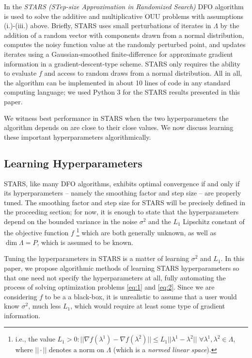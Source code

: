 \documentclass{amsart}
\begin{document}
In \cite{CW} the \textit{STARS (STep-size Approximation in Randomized Search)} DFO algorithm is used to solve the additive and multiplicative OUU problems with assumptions (i.)-(iii.) above. Briefly, STARS uses small perturbations of iterates in $\Lambda$ by the addition of a random vector with components drawn from a normal distribution, computes the noisy function value at the randomly perturbed point, and updates iterates using a Gaussian-smoothed finite-difference for approximate gradient information in a gradient-descent-type scheme. STARS only  requires the ability to evaluate $f$ and access to random draws from a normal distribution. All in all, the algorithm can be implemented in about 10 lines of code in any standard computing language; we used Python 3 for the STARS results presented in this paper. 

We witness best performance in STARS when the two hyperparameters the algorithm depends on are close to their close values. We now discuss learning these important hyperparameters algorithmically.


\subsection{Learning Hyperparameters} 
STARS, like many DFO algorithms, exhibits optimal convergence if and only if its hyperparameters -- namely the smoothing factor and step size -- are properly tuned. The smoothing factor and step size for STARS will be precisely defined in the proceeding section; for now, it is enough to state that the hyperparameters depend on the bounded variance in the noise $\sigma^2$ and the $L_1$ Lipschitz constant of the objective function $f$ 
\footnote{i.e., the value $L_1> 0: ||\nabla f(\lambda^1)-\nabla f(\lambda^2)|| \leq L_1 ||\lambda^1 -\lambda^2||$ $\forall \lambda^1, \lambda^2 \in \Lambda$, where $||\cdot||$ denotes a norm on $\Lambda$ (which is a \textit{normed linear space}).}
which are both generally unknown, as well as $\dim \Lambda=P$, which is assumed to be known. 

Tuning the hyperparameters in STARS is a matter of learning $\sigma^2$ and $L_1$. In this paper, we propose algorithmic methods of learning STARS hyperparameters so that one need not specify the hyperparameters at all, fully automating the process of solving optimization problems \eqref{eq:1} and \eqref{eq:2}. Since we are considering $f$ to be a a black-box, it is unrealistic to assume that a user would know $\sigma^2$, much less $L_1$, which would require at least some type of gradient information.
\end{document}
